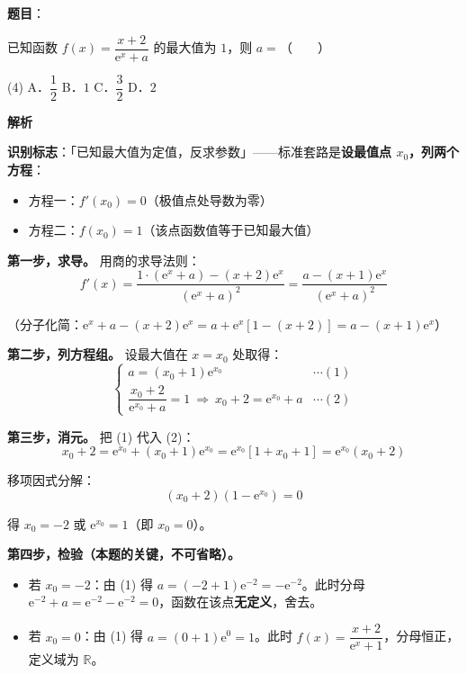 \begin{answer}

\textbf{题目}：

已知函数 $f(x)=\dfrac{x+2}{\mathrm{e}^{x}+a}$ 的最大值为 $1$，则 $a=$\mbox{（　　）}

\begin{gkopts}(4)
\task A．$\dfrac{1}{2}$
\task B．$1$
\task C．$\dfrac{3}{2}$
\task D．$2$
\end{gkopts}

\textbf{解析}

\textbf{识别标志}：「已知最大值为定值，反求参数」——标准套路是\textbf{设最值点 $x_0$，列两个方程}：
\begin{itemize}
\item 方程一：$f'(x_0)=0$（极值点处导数为零）
\item 方程二：$f(x_0)=1$（该点函数值等于已知最大值）
\end{itemize}

\textbf{第一步，求导。} 用商的求导法则：
\nopagebreak[4]
\[f'(x)=\frac{1\cdot(\mathrm{e}^{x}+a)-(x+2)\mathrm{e}^{x}}{(\mathrm{e}^{x}+a)^2}=\frac{a-(x+1)\mathrm{e}^{x}}{(\mathrm{e}^{x}+a)^2}\]

（分子化简：$\mathrm{e}^x+a-(x+2)\mathrm{e}^x=a+\mathrm{e}^x\left[1-(x+2)\right]=a-(x+1)\mathrm{e}^x$）

\textbf{第二步，列方程组。} 设最大值在 $x=x_0$ 处取得：
\nopagebreak[4]
\[\begin{cases}a=(x_0+1)\mathrm{e}^{x_0}&\cdots(1)\\[2mm] \dfrac{x_0+2}{\mathrm{e}^{x_0}+a}=1\ \Longrightarrow\ x_0+2=\mathrm{e}^{x_0}+a&\cdots(2)\end{cases}\]

\textbf{第三步，消元。} 把 (1) 代入 (2)：
\nopagebreak[4]
\[x_0+2=\mathrm{e}^{x_0}+(x_0+1)\mathrm{e}^{x_0}=\mathrm{e}^{x_0}\left[1+x_0+1\right]=\mathrm{e}^{x_0}(x_0+2)\]

移项因式分解：
\nopagebreak[4]
\[(x_0+2)\left(1-\mathrm{e}^{x_0}\right)=0\]

得 $x_0=-2$ 或 $\mathrm{e}^{x_0}=1$（即 $x_0=0$）。

\textbf{第四步，检验（本题的关键，不可省略）。}

\begin{itemize}
\item 若 $x_0=-2$：由 (1) 得 $a=(-2+1)\mathrm{e}^{-2}=-\mathrm{e}^{-2}$。此时分母 $\mathrm{e}^{-2}+a=\mathrm{e}^{-2}-\mathrm{e}^{-2}=0$，函数在该点\textbf{无定义}，舍去。
\item 若 $x_0=0$：由 (1) 得 $a=(0+1)\mathrm{e}^{0}=1$。此时 $f(x)=\dfrac{x+2}{\mathrm{e}^x+1}$，分母恒正，定义域为 $\mathbb{R}$。
\end{itemize}


\end{answer}
